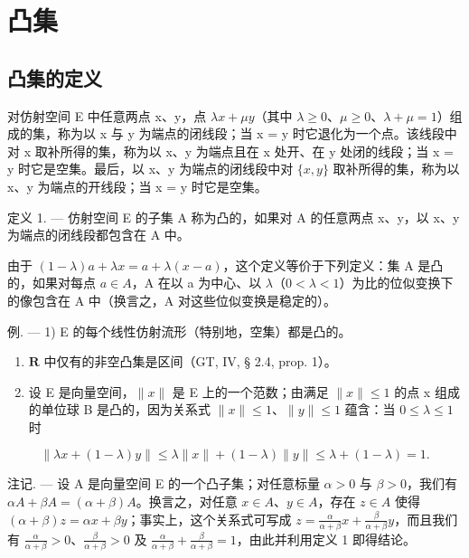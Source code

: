 \section{凸集}

\subsection{凸集的定义}

对仿射空间 E 中任意两点 x、y，点 \(\lambda x + \mu y\)（其中 \(\lambda \geqslant 0\)、\(\mu \geqslant 0\)、\(\lambda + \mu = 1\)）组成的集，称为以 x 与 y 为端点的闭线段；当 x = y 时它退化为一个点。该线段中对 x 取补所得的集，称为以 x、y 为端点且在 x 处开、在 y 处闭的线段；当 x = y 时它是空集。最后，以 x、y 为端点的闭线段中对 \(\{x, y\}\) 取补所得的集，称为以 x、y 为端点的开线段；当 x = y 时它是空集。

定义 1. --- 仿射空间 E 的子集 A 称为凸的，如果对 A 的任意两点 x、y，以 x、y 为端点的闭线段都包含在 A 中。

由于 \((1 - \lambda)a + \lambda x = a + \lambda(x - a)\)，这个定义等价于下列定义：集 A 是凸的，如果对每点 \(a \in A\)，A 在以 a 为中心、以 \(\lambda\)（\(0 < \lambda < 1\)）为比的位似变换下的像包含在 A 中（换言之，A 对这些位似变换是稳定的）。

例. --- 1) E 的每个线性仿射流形（特别地，空集）都是凸的。

\begin{enumerate}
\def\labelenumi{\arabic{enumi})}
\setcounter{enumi}{1}
\item
  \(\mathbf{R}\) 中仅有的非空凸集是区间（GT, IV, § 2.4, prop. 1）。
\item
  设 E 是向量空间，\(\|x\|\) 是 E 上的一个范数；由满足 \(\| x\| \leqslant 1\) 的点 x 组成的单位球 B 是凸的，因为关系式 \(\| x\| \leqslant 1\)、\(\| y\| \leqslant 1\) 蕴含：当 \(0\leqslant \lambda \leqslant 1\) 时
\end{enumerate}

\[
\left\| \lambda x + (1 - \lambda) y \right\| \leqslant \lambda \| x \| + (1 - \lambda) \| y \| \leqslant \lambda + (1 - \lambda) = 1.
\]

注记. --- 设 A 是向量空间 E 的一个凸子集；对任意标量 \(\alpha > 0\) 与 \(\beta > 0\)，我们有 \(\alpha A + \beta A = (\alpha + \beta) A\)。换言之，对任意 \(x \in A\)、\(y \in A\)，存在 \(z \in A\) 使得 \((\alpha + \beta) z = \alpha x + \beta y\)；事实上，这个关系式可写成 \(z = \frac{\alpha}{\alpha + \beta} x + \frac{\beta}{\alpha + \beta} y\)，而且我们有 \(\frac{\alpha}{\alpha + \beta} > 0\)、\(\frac{\beta}{\alpha + \beta} > 0\) 及 \(\frac{\alpha}{\alpha + \beta} + \frac{\beta}{\alpha + \beta} = 1\)，由此并利用定义 1 即得结论。

